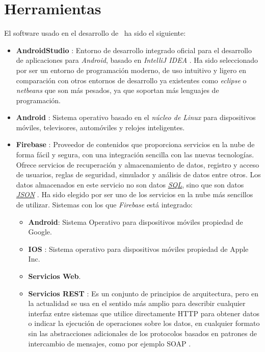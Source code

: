 %
%
%
%

\cleardoublepage
\chapter{Herramientas}
\label{chap:tools}

	El software usado en el desarrollo de \CollegeApp\ ha sido el siguiente:
	\begin{itemize}
		\item {\bf AndroidStudio} \cite{1:androidstudio:online}: Entorno de desarrollo integrado oficial para el desarrollo de aplicaciones para {\it Android}, basado en {\it IntelliJ IDEA} \cite{14:intellij:online}.
		Ha sido seleccionado por ser un entorno de programación moderno, de uso intuitivo y ligero en comparación con otros entornos de desarrollo ya existentes como {\it eclipse} \cite{15:eclipse:online} o {\it netbeans} \cite{22:netbeans:online} que son más pesados, ya que soportan más lenguajes de programación.
		\item {\bf Android} \cite{2:android:online}: Sistema operativo basado en el {\it núcleo de Linux} para dispositivos móviles, televisores, automóviles y relojes inteligentes.
		\item {\bf Firebase} \cite{6:firebase:online}: Proveedor de contenidos que proporciona servicios en la nube de forma fácil y segura, con una integración sencilla con las nuevas tecnologías. Ofrece servicios de recuperación y almacenamiento de datos, registro y acceso de usuarios, reglas de seguridad, simulador y análisis de datos entre otros. Los datos almacenados en este servicio no son datos \href{http://es.wikipedia.org/wiki/SQL}{\textit{SQL}}, sino que son datos \href{http://es.wikipedia.org/wiki/JSON}{\textit{JSON}} \cite{7:json:online}. Ha sido elegido por ser uno de los servicios en la nube más sencillos de utilizar.
		Sistemas con los que {\it Firebase} está integrado:
		\begin{itemize}
			\item {\bf Android}: Sistema Operativo para dispositivos móviles propiedad de Google.
			\item {\bf IOS} \cite{16:ios:online}: Sistema operativo para dispositivos móviles propiedad de Apple Inc.
			\item {\bf Servicios Web}.
			\item {\bf Servicios REST} \cite{18:rest:online}: Es un conjunto de principios de arquitectura, pero en la actualidad se usa en el sentido más amplio para describir cualquier interfaz entre sistemas que utilice directamente HTTP \cite{60:http:online} para obtener datos o indicar la ejecución de operaciones sobre los datos, en cualquier formato sin las abstracciones adicionales de los protocolos basados en patrones de intercambio de mensajes, como por ejemplo SOAP \cite{56:soap:online}.
		\end{itemize}
	\end{itemize}
	
